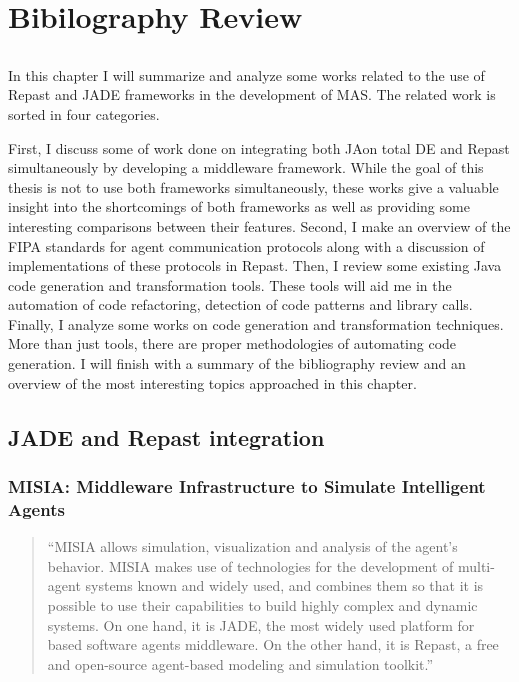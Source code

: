 \chapter{Bibilography Review} \label{chap:sota}

\section*{}



In this chapter I will summarize and analyze some works related to the use of Repast and JADE frameworks in the development of MAS. The related
work is sorted in four categories.

First, I discuss some of work done on integrating both JAon total DE and Repast simultaneously by developing a middleware framework.  While the goal of this thesis is not to use both frameworks simultaneously, these works give a valuable insight into the shortcomings of both frameworks as well as providing some interesting comparisons between their features.
Second, I make an overview of the FIPA standards for agent communication protocols along with a discussion of implementations of these protocols in Repast.
Then, I review some existing Java code generation and transformation tools. These tools will aid me in the automation of code refactoring, detection of code patterns and library calls.
Finally, I analyze some works on code generation and transformation techniques.
More than just tools, there are proper methodologies of automating code generation.
I will finish with a summary of the bibliography review and an overview of the most interesting topics approached in this chapter.

\section{JADE and Repast integration}


\subsection{
	MISIA: Middleware Infrastructure to Simulate Intelligent Agents}
\begin{quote}
	``MISIA allows simulation, visualization and analysis of the agent’s behavior. MISIA makes use of technologies for the development of multi-agent systems known and widely used, and combines them so that it is possible to use their capabilities to build highly complex and dynamic systems. On one hand, it is JADE, the most widely used platform for based software agents middleware. On the other hand, it is Repast, a free and open-source agent-based modeling and simulation toolkit.'' \cite{garcia2011misia}
\end{quote}

